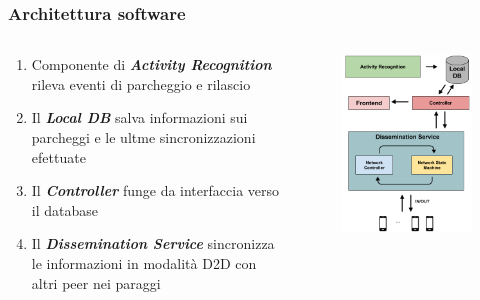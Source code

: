 \documentclass{beamer}
\begin{document}
\begin{frame}
  \frametitle{Architettura software}
  \begin{columns}
    \begin{column}{0.5\textwidth}
      \begin{enumerate}
	\item Componente di \textit{\textbf{Activity Recognition}} rileva eventi di parcheggio e rilascio
	\item Il \textit{\textbf{Local DB}} salva informazioni sui parcheggi e le ultme sincronizzazioni efettuate
	\item Il \textit{\textbf{Controller}} funge da interfaccia verso il database
	\item Il \textit{\textbf{Dissemination Service}} sincronizza le informazioni in modalità D2D con altri peer nei paraggi
      \end{enumerate}
    \end{column}

    \begin{column}{0.5\textwidth}
      \begin{figure}
	\includegraphics[scale=0.30]{img/arch_soft2.png}
      \end{figure}
    \end{column}
  \end{columns}
\end{frame}
\end{document}
